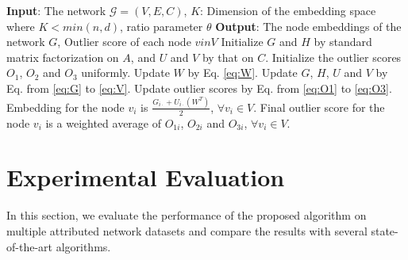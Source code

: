 \documentclass[letterpaper]{article} %
\begin{document}
\begin{algorithm} %
  \caption{\textbf{ONE}}
  \label{alg:oane}
\begin{algorithmic}[1]

	\Statex \textbf{Input}: The network $\mathcal{G}=(V,E,C)$, $K$: Dimension of the embedding space where $K<min(n,d)$, ratio parameter $\theta$
    \Statex \textbf{Output}: The node embeddings of the network $G$, Outlier score of each node $v in V$
	\State Initialize $G$ and $H$ by standard matrix factorization on $A$, and $U$ and $V$ by that on $C$.
    \State Initialize the outlier scores $O_1$, $O_2$ and $O_3$ uniformly.
    	\State Update $W$ by Eq. \ref{eq:W}.
		\State Update $G$, $H$, $U$ and $V$ by Eq. from \ref{eq:G} to \ref{eq:V}.
        \State Update outlier scores by Eq. from \ref{eq:O1} to \ref{eq:O3}.
    \EndFor
    \State Embedding for the node $v_i$ is $\frac{G_{i\cdot} + U_{i\cdot} (W^T)}{2}$, $\forall v_i \in V$.
    \State Final outlier score for the node $v_i$ is a weighted average of $O_{1i}$, $O_{2i}$ and $O_{3i}$, $\forall v_i \in V$.
	\end{algorithmic}
  \end{algorithm} %



\section{Experimental Evaluation}
In this section, we evaluate the performance of the proposed algorithm on multiple attributed network datasets and compare the results with several state-of-the-art algorithms.
\end{document}
